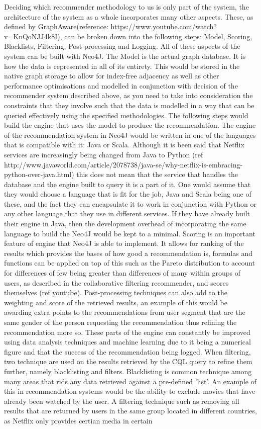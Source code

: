 \documentclass[a4paper]{article}
\begin{document}
Deciding which recommender methodology to us is only part of the system, the architecture of the system as a whole incorporates many other aspects. These, as defined by GraphAware(reference: https://www.youtube.com/watch?v=KnQoNJJ4k8I), can be broken down into the following steps: Model, Scoring, Blacklists, Filtering, Post-processing and Logging. All of these aspects of the system can be built with Neo4J. The Model is the actual graph database. It is how the data is represented in all of its entirety. This would be stored in the native graph storage to allow for index-free adjacency as well as other performance optimisations and modelled in conjunction with decision of the recommender system described above, as you need to take into consideration the constraints that they involve such that the data is modelled in a way that can be queried effectively using the specified methodologies. The following steps would build the engine that uses the model to produce the recommendation. The engine of the recommendation system in Neo4J would be written in one of the languages that is compatible with it: Java or Scala. Although it is been said that Netflix services are increasingly being changed from Java to Python (ref http://www.javaworld.com/article/2078738/java-se/why-netflix-is-embracing-python-over-java.html) this does not mean that the service that handles the database and the engine built to query it is a part of it. One would assume that they would choose a language that is fit for the job, Java and Scala being one of these, and the fact they can encapsulate it to work in conjunction with Python or any other language that they use in different services. If they have already built their engine in Java, then the development overhead of incorporating the same language to build the Neo4J would be kept to a minimal. Scoring is an important feature of engine that Neo4J is able to implement. It allows for ranking of the results which provides the bases of how good a recommendation is, formulas and functions can be applied on top of this such as the Pareto distribution to account for differences of few being greater than differences of many within groups of users, as described in the collaborative filtering recommender, and scores themselves (ref youtube). Post-processing techniques can also add to the weighting and score of the retrieved results, an example of this would be awarding extra points to the recommendations from user segment that are the same gender of the person requesting the recommendation thus refining the recommendation more so. These parts of the engine can constantly be improved using data analysis techniques and machine learning due to it being a numerical figure and that the success of the recommendation being logged. When filtering, two technique are used on the results retrieved by the CQL query to refine them further, namely blacklisting and filters. Blacklisting is common technique among many areas that rids any data retrieved against a pre-defined 'list'. An example of this in recommendation systems would be the ability to exclude movies that have already been watched by the user. A filtering technique such as removing all results that are returned by users in the same group located in different countries, as Netflix only provides certian media in certain 
\end{document}
